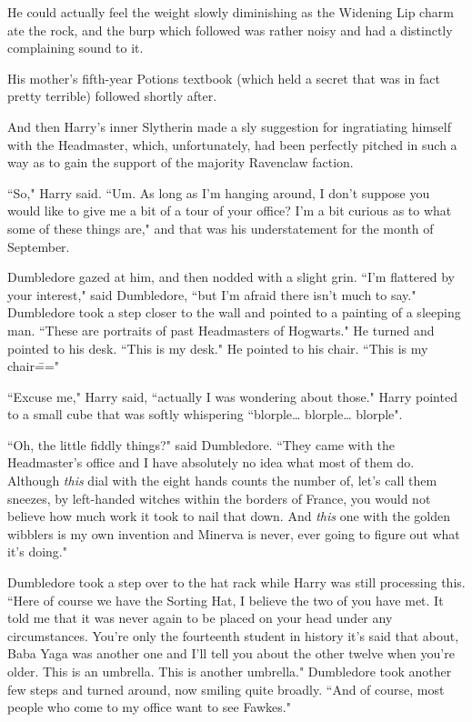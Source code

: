 He could actually feel the weight slowly diminishing as the Widening Lip charm ate the rock, and the burp which followed was rather noisy and had a distinctly complaining sound to it.

His mother's fifth-year Potions textbook (which held a secret that was in fact pretty terrible) followed shortly after.

And then Harry's inner Slytherin made a sly suggestion for ingratiating himself with the Headmaster, which, unfortunately, had been perfectly pitched in such a way as to gain the support of the majority Ravenclaw faction.

``So," Harry said. ``Um. As long as I'm hanging around, I don't suppose you would like to give me a bit of a tour of your office? I'm a bit curious as to what some of these things are," and that was his understatement for the month of September.

Dumbledore gazed at him, and then nodded with a slight grin. ``I'm flattered by your interest," said Dumbledore, ``but I'm afraid there isn't much to say." Dumbledore took a step closer to the wall and pointed to a painting of a sleeping man. ``These are portraits of past Headmasters of Hogwarts." He turned and pointed to his desk. ``This is my desk." He pointed to his chair. ``This is my chair\==="

``Excuse me," Harry said, ``actually I was wondering about those." Harry pointed to a small cube that was softly whispering ``blorple{\ldots} blorple{\ldots} blorple".

``Oh, the little fiddly things?" said Dumbledore. ``They came with the Headmaster's office and I have absolutely no idea what most of them do. Although \emph{this} dial with the eight hands counts the number of, let's call them sneezes, by left-handed witches within the borders of France, you would not believe how much work it took to nail that down. And \emph{this} one with the golden wibblers is my own invention and Minerva is never, ever going to figure out what it's doing."

Dumbledore took a step over to the hat rack while Harry was still processing this. ``Here of course we have the Sorting Hat, I believe the two of you have met. It told me that it was never again to be placed on your head under any circumstances. You're only the fourteenth student in history it's said that about, Baba Yaga was another one and I'll tell you about the other twelve when you're older. This is an umbrella. This is another umbrella." Dumbledore took another few steps and turned around, now smiling quite broadly. ``And of course, most people who come to my office want to see Fawkes."

